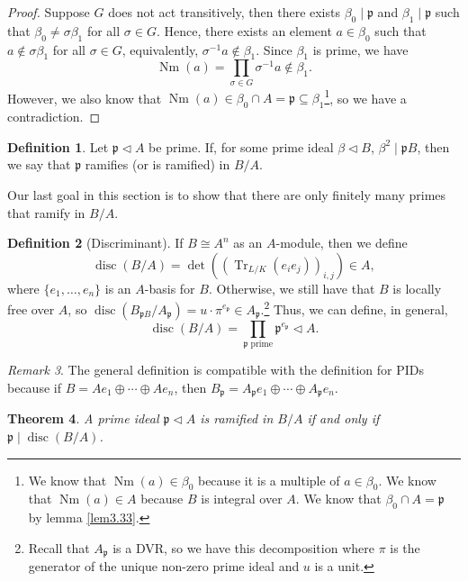 \documentclass{tufte-handout} %
\newtheorem{thm}{Theorem}
\theoremstyle{definition}
\newtheorem{defn}[thm]{Definition}
\theoremstyle{remark}
\newtheorem{rem}[thm]{Remark}
\newcommand{\bra}[1]{\left(#1\right)}
\newcommand{\lp}{{\mathfrak{p}}}
\DeclareMathOperator{\disc}{disc}
\DeclareMathOperator{\Tr}{Tr}
\DeclareMathOperator{\Nm}{Nm}
\begin{document}
\begin{proof}
	Suppose $G$ does not act transitively, then there exists $\beta_0 \mid \lp$ and $\beta_1 \mid \lp$ such that $\beta_0 \neq \sigma\beta_1$ for all $\sigma \in G$. Hence, there exists an element $a \in \beta_0$ such that $a \notin \sigma \beta_1$ for all $\sigma \in G$, equivalently, $\sigma^{-1}a \notin \beta_1$. Since $\beta_1$ is prime, we have
	\[\Nm(a) = \prod_{\sigma \in G} \sigma^{-1}a \notin \beta_1.\] However, we also know that $\Nm(a) \in \beta_0 \cap A = \lp\subseteq \beta_1$\footnote{We know that $\Nm(a) \in \beta_0$ because it is a multiple of $a \in \beta_0$. We know that $\Nm(a) \in A$ because $B$ is integral over $A$. We know that $\beta_0 \cap A = \lp$ by lemma \ref{lem3.33}.}, so we have a contradiction.%
\end{proof}
\begin{defn}
	Let $\lp \lhd A$ be prime. If, for some prime ideal $\beta \lhd B$, $\beta^2 \mid \lp B$, then we say that $\lp$ ramifies (or is ramified) in $B/A$.
\end{defn}
Our last goal in this section is to show that there are only finitely many primes that ramify in $B/A$.
\begin{defn}[Discriminant]%
	If $B \cong A^n$ as an $A$-module, then we define \[\disc(B/A) = \det\bra{\bra{\Tr_{L/K}(e_ie_j)}_{i,j}}\in A,\]
	where $\{e_1, \dots, e_n\}$ is an $A$-basis for $B$. Otherwise, we still have that $B$ is locally free over $A$, so $\disc(B_{\lp B}/A_{\lp}) = u\cdot \pi^{e_{\lp}}\in A_{\lp}$.\footnote{Recall that $A_{\lp}$ is a DVR, so we have this decomposition where $\pi$ is the generator of the unique non-zero prime ideal and $u$ is a unit.} Thus, we can define, in general, 
	\[\disc(B/A) = \prod_{\lp \text{ prime}} \lp^{e_{\lp}} \lhd A.\]
\end{defn}
\begin{rem}
	The general definition is compatible with the definition for PIDs because if $B = Ae_1 \oplus \cdots \oplus Ae_n$, then $B_{\lp} = A_{\lp}e_1 \oplus \cdots \oplus A_{\lp}e_n$. %
\end{rem}
\begin{thm}
	A prime ideal $\lp \lhd A$ is ramified in $B/A$ if and only if $\lp \mid \disc(B/A)$.
\end{thm}
\end{document}
